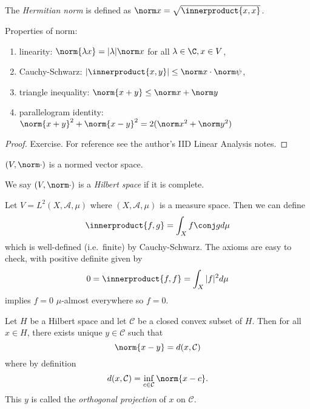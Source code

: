 \documentclass[a4paper]{article}
\newcommand*{\ip}{\innerproduct} %
\begin{document}
\begin{definition}
  The \emph{Hermitian norm} is defined as \(\norm x = \sqrt{\ip{x, x}}\).
\end{definition}

\begin{lemma}
  Properties of norm:
  \begin{enumerate}
  \item linearity: \(\norm{\lambda x} = |\lambda| \norm x\) for all \(\lambda \in \C, x \in V\),
  \item Cauchy-Schwarz: \(|\ip{x, y}| \leq \norm x \cdot \norm \psi\),
  \item triangle inequality: \(\norm{x + y} \leq \norm x + \norm y\)
  \item parallelogram identity: \(\norm{x + y}^2 + \norm{x - y}^2 = 2(\norm x^2 + \norm y^2)\)
  \end{enumerate}
\end{lemma}

\begin{proof}
  Exercise. For reference see the author's IID Linear Analysis notes.
\end{proof}

\begin{corollary}
  \((V, \norm \cdot)\) is a normed vector space.
\end{corollary}

\begin{definition}
  We say \((V, \norm \cdot)\) is a \emph{Hilbert space} if it is complete.
\end{definition}

\begin{eg}
  Let \(V = L^2(X, \mathcal A, \mu)\) where \((X, \mathcal A, \mu)\) is a measure space. Then we can define
  \[
    \ip{f, g} = \int_X f \conj g d\mu
  \]
  which is well-defined (i.e.\ finite) by Cauchy-Schwarz. The axioms are easy to check, with positive definite given by
  \[
    0 = \ip{f, f} = \int_X |f|^2 d\mu
  \]
  implies \(f = 0\) \(\mu\)-almost everywhere so \(f = 0\).
\end{eg}

\begin{proposition}
  Let \(H\) be a Hilbert space and let \(\mathcal C\) be a closed convex subset of \(H\). Then for all \(x \in H\), there exists unique \(y \in \mathcal C\) such that
  \[
    \norm{x - y} = d(x, \mathcal C)
  \]
  where by definition
  \[
    d(x, \mathcal C) = \inf_{c \in \mathcal C} \norm{x - c}.
  \]
  This \(y\) is called the \emph{orthogonal projection} of \(x\) on \(\mathcal C\).
\end{proposition}
\end{document}
